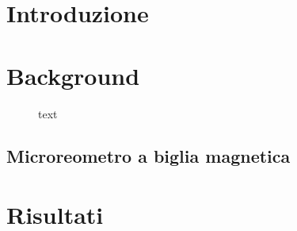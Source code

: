 \section{Introduzione}



\textcolor{blue}{\lipsum[1]}

\section{Background}

\textcolor{blue}{\lipsum[1-4]}

\begin{figure}[t!]
	\centering
	\footnotesize{
	 \def\svgwidth{\linewidth}
	 }
	\caption{}
	\label{fig:system}
\end{figure}


\begin{figure}[h!]
	\begin{subfigure}{0.5\linewidth}
	\centering
	\footnotesize{
	\def\svgwidth{0.9\linewidth}
	}
\caption{}
\label{fig:mechanical}
	\end{subfigure}\hfill
	\begin{subfigure}{0.5\linewidth}
	\centering
	\footnotesize{
	\def\svgwidth{0.9\linewidth}
	}
\caption{}
\label{fig:mechanical1}
\end{subfigure}\hfill
\caption{text}
\end{figure}



\subsection{Microreometro a biglia magnetica}




\section{Risultati}

